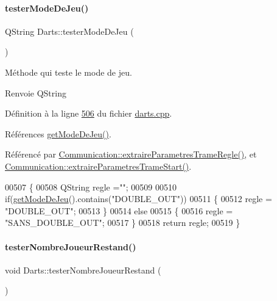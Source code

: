 \paragraph{\texorpdfstring{tester\+Mode\+De\+Jeu()}{testerModeDeJeu()}}
{\footnotesize\ttfamily Q\+String Darts\+::tester\+Mode\+De\+Jeu (\begin{DoxyParamCaption}{ }\end{DoxyParamCaption})}



Méthode qui teste le mode de jeu. 

\begin{DoxyReturn}{Renvoie}
Q\+String 
\end{DoxyReturn}


Définition à la ligne \hyperlink{darts_8cpp_source_l00506}{506} du fichier \hyperlink{darts_8cpp_source}{darts.\+cpp}.



Références \hyperlink{darts_8cpp_source_l00099}{get\+Mode\+De\+Jeu()}.



Référencé par \hyperlink{communication_8cpp_source_l00279}{Communication\+::extraire\+Parametres\+Trame\+Regle()}, et \hyperlink{communication_8cpp_source_l00243}{Communication\+::extraire\+Parametres\+Trame\+Start()}.


\begin{DoxyCode}
00507 \{
00508     QString regle =\textcolor{stringliteral}{""};
00509 
00510     \textcolor{keywordflow}{if}(\hyperlink{class_darts_a49ea4ca23fd03d80f5a95257c6fe8478}{getModeDeJeu}().contains(\textcolor{stringliteral}{"DOUBLE\_OUT"}))
00511     \{
00512         regle = \textcolor{stringliteral}{"DOUBLE\_OUT"};
00513     \}
00514     \textcolor{keywordflow}{else}
00515     \{
00516         regle = \textcolor{stringliteral}{"SANS\_DOUBLE\_OUT"};
00517     \}
00518     \textcolor{keywordflow}{return} regle;
00519 \}
\end{DoxyCode}
\mbox{\label{class_darts_a0fbfcd2202600e886177e2202a44b3bd}} 
\paragraph{\texorpdfstring{tester\+Nombre\+Joueur\+Restand()}{testerNombreJoueurRestand()}}
{\footnotesize\ttfamily void Darts\+::tester\+Nombre\+Joueur\+Restand (\begin{DoxyParamCaption}{ }\end{DoxyParamCaption})\hspace{0.3cm}{\ttfamily [private]}}



